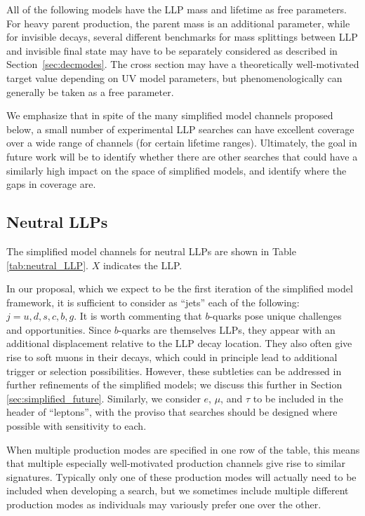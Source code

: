 All of the following models have the LLP mass and lifetime as free parameters. For heavy parent production, the parent mass is an additional parameter, while for invisible decays, several different benchmarks for mass splittings between LLP and invisible final state may have to be separately considered as described in Section~\ref{sec:decmodes}. The cross section may have  a theoretically well-motivated target value depending on  UV model parameters, but phenomenologically can generally be taken as a free parameter.

We emphasize that in spite of the many simplified model
channels proposed below, a small number of experimental LLP searches can
have excellent coverage over a wide range of channels (for certain lifetime ranges). Ultimately, the goal in future work will be
to  identify whether there are other searches that could
have a similarly high impact on the space of simplified models, and  identify where the gaps in coverage are.

\subsection{Neutral LLPs}

The simplified model channels for neutral LLPs are shown in Table
\ref{tab:neutral_LLP}.  $X$ indicates the
LLP.

 
 In our proposal, which we expect to be the first iteration of the simplified
model framework, it is sufficient to consider as ``jets'' each of the
following:~$j=u,d,s,c,b,g$. It is worth commenting that $b$-quarks pose
unique challenges and opportunities. Since $b$-quarks are themselves
LLPs, they appear with an additional displacement relative to the LLP
decay location. They also often give rise to soft muons in their
decays, which could in principle lead to additional trigger or
selection possibilities.  However, these subtleties can be addressed
in further refinements of the simplified models; we discuss this further in Section
\ref{sec:simplified_future}. Similarly, we consider $e$,
$\mu$, and $\tau$ to be included in the header of ``leptons'', with the proviso that
searches should be designed where possible with sensitivity to each.
 
When multiple production modes are specified in one row of the table, this means that multiple
 especially well-motivated production channels give rise to similar
signatures. Typically only one of these production modes will actually need to
be included when developing a search, but we sometimes include multiple different production modes
as individuals may variously prefer one over the other. 


